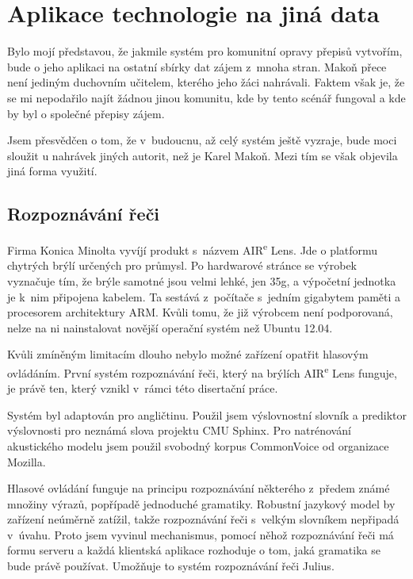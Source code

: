 \chapter{Aplikace technologie na jiná data}
\label{kap:jina-data}


Bylo mojí představou, že jakmile systém pro komunitní opravy přepisů vytvořím,
bude o jeho aplikaci na ostatní sbírky dat zájem z~mnoha stran. Makoň přece není
jediným duchovním učitelem, kterého jeho žáci nahrávali. Faktem však je, že se mi
nepodařilo najít žádnou jinou komunitu, kde by tento scénář fungoval a kde by
byl o společné přepisy zájem.

Jsem přesvědčen o tom, že v~budoucnu, až celý systém ještě vyzraje, bude moci
sloužit u nahrávek jiných autorit, než je Karel Makoň. Mezi tím se však objevila jiná
forma využití.

\section{Rozpoznávání řeči}

Firma Konica Minolta vyvíjí produkt s~názvem AIR\textsuperscript{e} Lens. Jde o platformu
chytrých brýlí určených pro průmysl. Po hardwarové stránce se výrobek vyznačuje
tím, že brýle samotné jsou velmi lehké, jen 35g, a výpočetní jednotka je k~nim
připojena kabelem. Ta sestává z~počítače s~jedním gigabytem paměti a procesorem
architektury ARM. Kvůli tomu, že již výrobcem není podporovaná, nelze na ni
nainstalovat novější operační systém než Ubuntu 12.04.

Kvůli zmíněným limitacím dlouho nebylo možné zařízení opatřit hlasovým
ovládáním. První systém rozpoznávání řeči, který na brýlích AIR\textsuperscript{e} Lens
funguje, je právě ten, který vznikl v~rámci této disertační práce.

Systém byl adaptován pro angličtinu. Použil jsem výslovnostní slovník a
prediktor výslovnosti pro neznámá slova projektu CMU Sphinx\cite{huggins2006pocketsphinx}\cite{lamere2003cmu}.
Pro natrénování akustického modelu jsem použil svobodný korpus CommonVoice od
organizace Mozilla.

Hlasové ovládání funguje na principu rozpoznávání některého z~předem známé
množiny výrazů, popřípadě jednoduché gramatiky. Robustní jazykový model by
zařízení neúměrně zatížil, takže rozpoznávání řeči s~velkým slovníkem nepřipadá
v~úvahu. Proto jsem vyvinul mechanismus, pomocí něhož
rozpoznávání řeči má formu serveru a každá klientská aplikace rozhoduje o tom,
jaká gramatika se bude právě používat. Umožňuje to systém rozpoznávání řeči
Julius\cite{lee2001julius}\cite{lee2009recent}.

